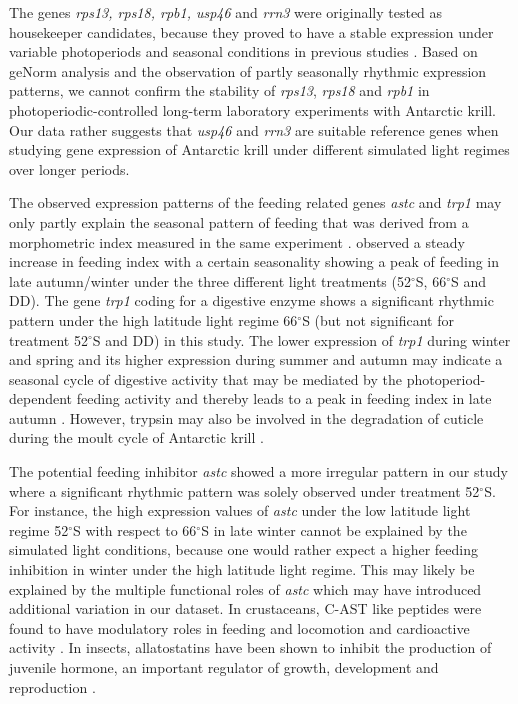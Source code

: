 The genes \textit{rps13, rps18, rpb1, usp46} and \textit{rrn3} were originally
tested as housekeeper candidates, because they proved to have a stable
expression under variable photoperiods and seasonal conditions in previous
studies \citep[; and Biscontin et al., in prep]{hafker_calanus_2018,
piccolin_photoperiodic_2018, piccolin_seasonal_2018, shi_distinct_2016}. Based
on geNorm analysis and the observation of partly seasonally rhythmic expression
patterns, we cannot confirm the stability of \textit{rps13}, \textit{rps18} and
\textit{rpb1} in photoperiodic-controlled long-term laboratory experiments with
Antarctic krill. Our data rather suggests that \textit{usp46} and \textit{rrn3}
are suitable reference genes when studying gene expression of Antarctic krill
under different simulated light regimes over longer periods. 

The observed expression patterns of the feeding related genes \textit{astc} and
\textit{trp1} may only partly explain the seasonal pattern of feeding that was
derived from a morphometric index measured in the same experiment
\citep{horing_light_2018}. \citet{horing_light_2018} observed a steady increase
in feeding index with a certain seasonality showing a peak of feeding in late
autumn/winter under the three different light treatments (52$^{\circ}$S,
66$^{\circ}$S and DD). The gene \textit{trp1} coding for a digestive enzyme
shows a significant rhythmic pattern under the high latitude light regime
66$^{\circ}$S (but not significant for treatment 52$^{\circ}$S and DD) in this
study. The lower expression of \textit{trp1} during winter and spring and its
higher expression during summer and autumn may indicate a seasonal cycle of
digestive activity that may be mediated by the photoperiod-dependent feeding
activity \citep{teschke_simulated_2007} and thereby leads to a peak in feeding
index in late autumn \citep{horing_light_2018}. However, trypsin may also be
involved in the degradation of cuticle during the moult cycle of Antarctic
krill \citep{seear_differential_2010}.

The potential feeding inhibitor \textit{astc} showed a more irregular pattern
in our study where a significant rhythmic pattern was solely observed under
treatment 52$^{\circ}$S. For instance, the high expression values of
\textit{astc} under the low latitude light regime 52$^{\circ}$S with respect to
66$^{\circ}$S in late winter cannot be explained by the simulated light
conditions, because one would rather expect a higher feeding inhibition in
winter under the high latitude light regime. This may likely be explained by
the multiple functional roles of \textit{astc} which may have introduced
additional variation in our dataset. In crustaceans, C-AST like peptides were
found to have modulatory roles in feeding and locomotion
\citep{wilson_distribution_2010} and cardioactive activity
\citep{dickinson_identification_2009}. In insects, allatostatins have been
shown to inhibit the production of juvenile hormone, an important regulator of
growth, development and reproduction \citep{weaver_neuropeptide_2009}. 

